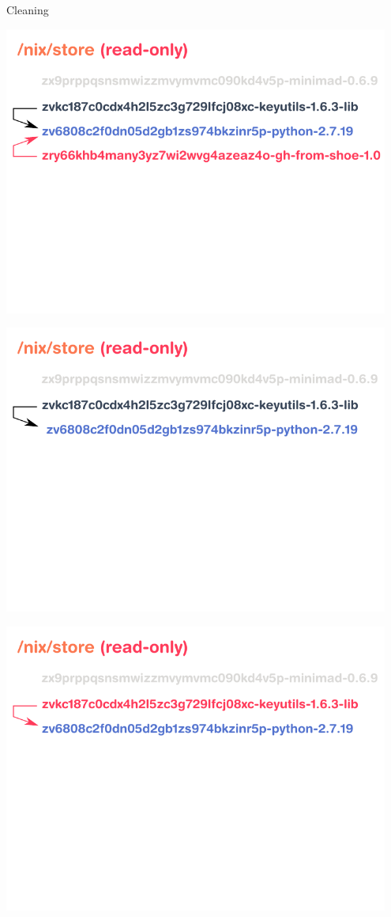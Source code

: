 \documentclass[t, aspectratio=169]{beamer}
\begin{document}
\begin{frame}{Cleaning}
     {
        \begin{center}
            \includegraphics[width=0.95\textwidth]{img/schema-nix-store-cleaning-1.pdf}
        \end{center}
    }
     {
        \begin{center}
            \includegraphics[width=0.95\textwidth]{img/schema-nix-store-cleaning-2.pdf}
        \end{center}
    }
     {
        \begin{center}
            \includegraphics[width=0.95\textwidth]{img/schema-nix-store-cleaning-3.pdf}

\end{center}}
\end{frame}
\end{document}
